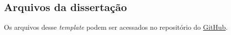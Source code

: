 

\begin{apendicesenv}

	\chapter{Arquivos da dissertação} \label{ap:a'}

	Os arquivos desse \textit{template} podem ser acessados no repositório do \href{https://github.com/felipeduplat/TeX-repository}{GitHub}.

\end{apendicesenv}


